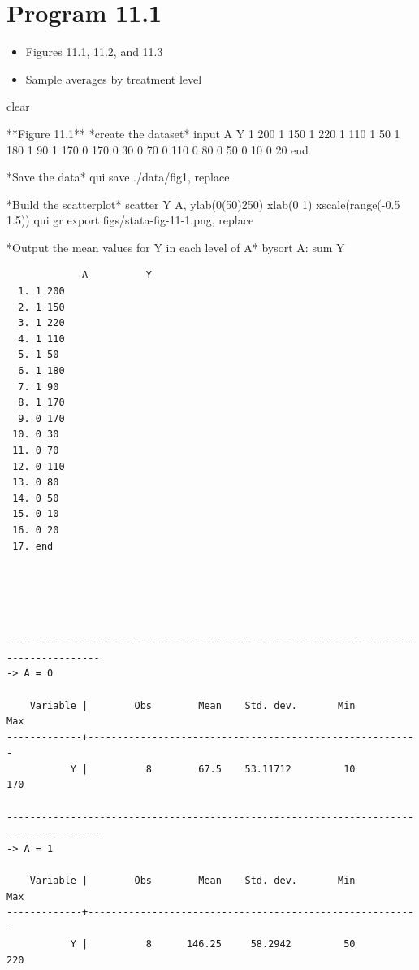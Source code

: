\documentclass[
  10pt,
  a4paper,
]{book}
\newenvironment{Shaded}{\begin{snugshade}}{\end{snugshade}}
\newcommand{\BaseNTok}[1]{\textcolor[rgb]{0.68,0.00,0.00}{#1}}
\newcommand{\DecValTok}[1]{\textcolor[rgb]{0.68,0.00,0.00}{#1}}
\newcommand{\KeywordTok}[1]{\textcolor[rgb]{0.00,0.46,0.62}{#1}}
\newcommand{\NormalTok}[1]{\textcolor[rgb]{0.00,0.46,0.62}{#1}}
\providecommand{\tightlist}{%
  \setlength{\itemsep}{0pt}\setlength{\parskip}{0pt}}
\begin{document}
\hypertarget{program-11.1-1}{%
\section{Program 11.1}\label{program-11.1-1}}

\begin{itemize}
\tightlist
\item
  Figures 11.1, 11.2, and 11.3
\item
  Sample averages by treatment level
\end{itemize}

\begin{Shaded}
\begin{Highlighting}[]
\KeywordTok{clear}

\NormalTok{**Figure 11.1**}
\NormalTok{*create the dataset*}
\NormalTok{input A Y}
\NormalTok{1 200}
\NormalTok{1 150}
\NormalTok{1 220}
\NormalTok{1 110}
\NormalTok{1 50}
\NormalTok{1 180}
\NormalTok{1 90}
\NormalTok{1 170}
\NormalTok{0 170}
\NormalTok{0 30}
\NormalTok{0 70}
\NormalTok{0 110}
\NormalTok{0 80}
\NormalTok{0 50}
\NormalTok{0 10}
\NormalTok{0 20}
\KeywordTok{end}

\NormalTok{*Save the }\KeywordTok{data}\NormalTok{*}
\KeywordTok{qui} \KeywordTok{save}\NormalTok{ ./}\KeywordTok{data}\NormalTok{/fig1, }\KeywordTok{replace}

\NormalTok{*Build the scatterplot*}
\KeywordTok{scatter}\NormalTok{ Y A, ylab(0(50)250) xlab(0 1) }\BaseNTok{xscale}\NormalTok{(}\KeywordTok{range}\NormalTok{({-}0.5 1.5))}
\KeywordTok{qui} \KeywordTok{gr} \KeywordTok{export}\NormalTok{ figs/stata{-}fig{-}11{-}1.png, }\KeywordTok{replace}

\NormalTok{*Output the }\KeywordTok{mean} \KeywordTok{values} \KeywordTok{for}\NormalTok{ Y }\KeywordTok{in}\NormalTok{ each }\DecValTok{level} \KeywordTok{of}\NormalTok{ A*}
\KeywordTok{bysort}\NormalTok{ A: }\KeywordTok{sum}\NormalTok{ Y}
\end{Highlighting}
\end{Shaded}

\begin{verbatim}
             A          Y
  1. 1 200
  2. 1 150
  3. 1 220
  4. 1 110
  5. 1 50
  6. 1 180
  7. 1 90
  8. 1 170
  9. 0 170
 10. 0 30
 11. 0 70
 12. 0 110
 13. 0 80
 14. 0 50
 15. 0 10
 16. 0 20
 17. end





--------------------------------------------------------------------------------------
-> A = 0

    Variable |        Obs        Mean    Std. dev.       Min        Max
-------------+---------------------------------------------------------
           Y |          8        67.5    53.11712         10        170

--------------------------------------------------------------------------------------
-> A = 1

    Variable |        Obs        Mean    Std. dev.       Min        Max
-------------+---------------------------------------------------------
           Y |          8      146.25     58.2942         50        220
\end{verbatim}
\end{document}
